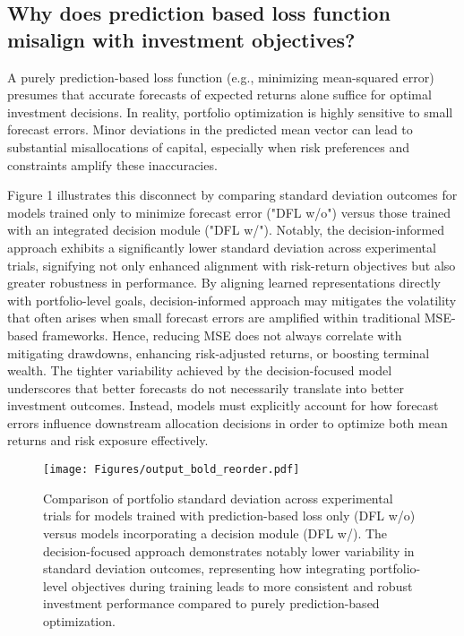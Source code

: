 
\subsection{Why does prediction based loss function misalign with investment objectives?} 

A purely prediction-based loss function (e.g., minimizing mean-squared error) presumes that accurate forecasts of expected returns alone suffice for optimal investment decisions. In reality, portfolio optimization is highly sensitive to small forecast errors. Minor deviations in the predicted mean vector can lead to substantial misallocations of capital, especially when risk preferences and constraints amplify these inaccuracies.

Figure 1 illustrates this disconnect by comparing standard deviation outcomes for models trained only to minimize forecast error ("DFL w/o") versus those trained with an integrated decision module ("DFL w/"). Notably, the decision-informed approach exhibits a significantly lower standard deviation across experimental trials, signifying not only enhanced alignment with risk-return objectives but also greater robustness in performance. By aligning learned representations directly with portfolio-level goals, decision-informed approach may mitigates the volatility that often arises when small forecast errors are amplified within traditional MSE-based frameworks. Hence, reducing MSE does not always correlate with mitigating drawdowns, enhancing risk-adjusted returns, or boosting terminal wealth. The tighter variability achieved by the decision-focused model underscores that better forecasts do not necessarily translate into better investment outcomes. Instead, models must explicitly account for how forecast errors influence downstream allocation decisions in order to optimize both mean returns and risk exposure effectively.

\begin{figure}[h!] %
  \centering
  \texttt{[image: Figures/output\_bold\_reorder.pdf]}%
   \captionsetup{font=footnotesize}
   \caption{Comparison of portfolio standard deviation across experimental trials for models trained with prediction-based loss only (DFL w/o) versus models incorporating a decision module (DFL w/). The decision-focused approach demonstrates notably lower variability in standard deviation outcomes, representing how integrating portfolio-level objectives during training leads to more consistent and robust investment performance compared to purely prediction-based optimization.}
  \label{fig:dfl}
\end{figure}

